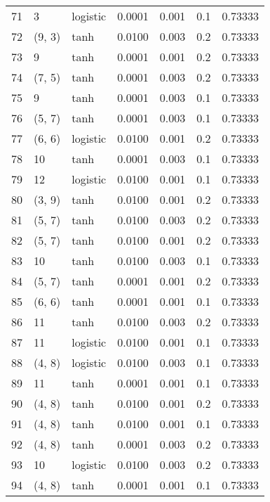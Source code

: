 \begin{tabular}{lllrrrr}
71  &           3 &  logistic &  0.0001 &  0.001 &  0.1 &   0.73333 \\
72  &      (9, 3) &      tanh &  0.0100 &  0.003 &  0.2 &   0.73333 \\
73  &           9 &      tanh &  0.0001 &  0.001 &  0.2 &   0.73333 \\
74  &      (7, 5) &      tanh &  0.0001 &  0.003 &  0.2 &   0.73333 \\
75  &           9 &      tanh &  0.0001 &  0.003 &  0.1 &   0.73333 \\
76  &      (5, 7) &      tanh &  0.0001 &  0.003 &  0.1 &   0.73333 \\
77  &      (6, 6) &  logistic &  0.0100 &  0.001 &  0.2 &   0.73333 \\
78  &          10 &      tanh &  0.0001 &  0.003 &  0.1 &   0.73333 \\
79  &          12 &  logistic &  0.0100 &  0.001 &  0.1 &   0.73333 \\
80  &      (3, 9) &      tanh &  0.0100 &  0.001 &  0.2 &   0.73333 \\
81  &      (5, 7) &      tanh &  0.0100 &  0.003 &  0.2 &   0.73333 \\
82  &      (5, 7) &      tanh &  0.0100 &  0.001 &  0.2 &   0.73333 \\
83  &          10 &      tanh &  0.0100 &  0.003 &  0.1 &   0.73333 \\
84  &      (5, 7) &      tanh &  0.0001 &  0.001 &  0.2 &   0.73333 \\
85  &      (6, 6) &      tanh &  0.0001 &  0.001 &  0.1 &   0.73333 \\
86  &          11 &      tanh &  0.0100 &  0.003 &  0.2 &   0.73333 \\
87  &          11 &  logistic &  0.0100 &  0.001 &  0.1 &   0.73333 \\
88  &      (4, 8) &  logistic &  0.0100 &  0.003 &  0.1 &   0.73333 \\
89  &          11 &      tanh &  0.0001 &  0.001 &  0.1 &   0.73333 \\
90  &      (4, 8) &      tanh &  0.0100 &  0.001 &  0.2 &   0.73333 \\
91  &      (4, 8) &      tanh &  0.0100 &  0.001 &  0.1 &   0.73333 \\
92  &      (4, 8) &      tanh &  0.0001 &  0.003 &  0.2 &   0.73333 \\
93  &          10 &  logistic &  0.0100 &  0.003 &  0.2 &   0.73333 \\
94  &      (4, 8) &      tanh &  0.0001 &  0.001 &  0.1 &   0.73333 \\

\end{tabular}
